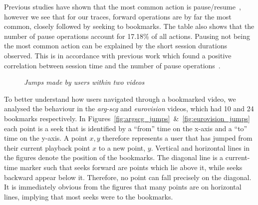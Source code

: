 \documentclass[a4paper,11pt]{article}
\newcommand{\capttext}{\protect\centering\em}
\begin{document}
Previous studies have shown that the most common action is pause/resume~\cite{Costa04Analyzing}, however we see that for our traces, forward operations are by far the most common, closely followed by seeking to bookmarks. The table also shows that the number of pause operations account for 17.18\% of all actions. Pausing not being the most common action can be explained by the short session durations observed. This is in accordance with previous work which found a positive correlation between session time and the number of pause operations~\cite{vilas2005user}.

\begin{figure}[tbp]
    \centering


    \caption{\capttext Jumps made by users within two videos}
    \label{fig:jumps}
\end{figure}

To better understand how users navigated through a bookmarked video, we analysed the behaviour in the \emph{arg-scg} and \emph{eurovision} videos, which had 10 and 24 bookmarks respectively. In Figures~\ref{fig:argscg_jumps}~\&~\ref{fig:eurovision_jumps} each point is a seek that is identified by a ``from'' time on the x-axis and a ``to'' time on the y-axis. A point $x,y$ therefore represents a user that has jumped from their current playback point $x$ to a new point, $y$. Vertical and horizontal lines in the figures denote the position of the bookmarks. The diagonal line is a current-time marker such that seeks forward are points which lie above it, while seeks backward appear below it. Therefore, no point can fall precisely on the diagonal. It is immediately obvious from the figures that many points are on horizontal lines, implying that most seeks were to the bookmarks.
\end{document}
